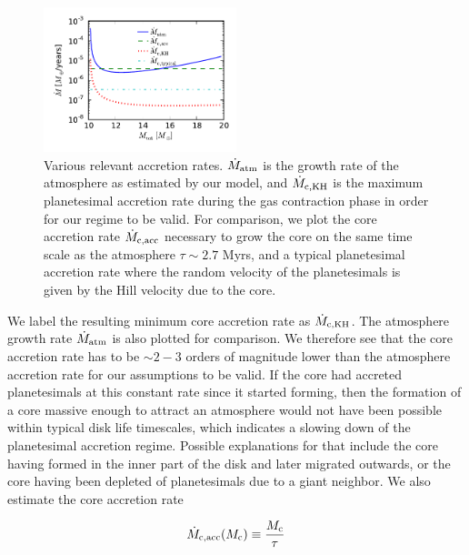 \documentclass[apj]{emulateapj}
\begin{document}
 \begin{figure}[h]
\centering
\includegraphics[width=0.5\textwidth]{../../figs/ModelAtmospheres/RadSelfGravPoly/acc_rates_paper.pdf}
\caption{Various relevant accretion rates. $\dot{M}_{\rm{atm}}$ is the growth rate of the atmosphere as estimated by our model, and $\dot{M}_{\rm{c,KH}}$ is the maximum planetesimal accretion rate during the gas contraction phase in order for our regime to be valid. For comparison, we plot the core accretion rate $\dot{M}_{\rm{c,acc}}$ necessary to grow the core on the same time scale as the atmosphere $\tau \sim 2.7$ Myrs, and a typical planetesimal accretion rate where the random velocity of the planetesimals is given by the Hill velocity due to the core.}
\label{fig:accrates}
\end{figure}

We label the resulting minimum core accretion rate as $\dot{M}_{\rm{c,KH}}$. The atmosphere growth rate $\dot{M}_{\rm{atm}}$ is also plotted for comparison. We therefore see that the core accretion rate has to be $\sim2-3$ orders of magnitude lower than the atmosphere accretion rate for our assumptions to be valid.  If the core had accreted planetesimals at this constant rate since it started forming, then the formation of a core massive enough to attract an atmosphere would not have been possible within typical disk life timescales, which indicates a slowing down of the planetesimal accretion regime. Possible explanations for that include the core having formed in the inner part of the disk and later migrated outwards, or the core having been depleted of planetesimals due to a giant neighbor. We also estimate the core accretion rate 

\begin{equation}
\label{eq:Mcdot}
\dot{M}_{\rm{c,acc}}(M_{\rm{c}}) \equiv \frac{M_{\rm{c}}}{\tau}
\end{equation}
\end{document}
